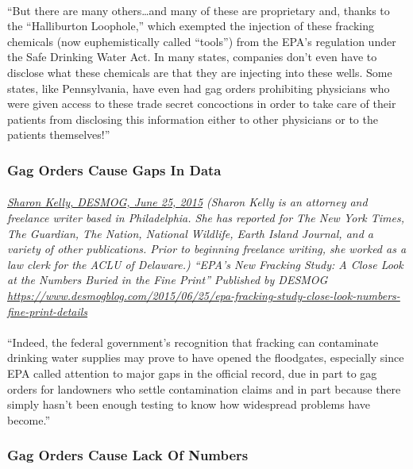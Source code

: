 \documentclass{article}
\begin{document}
\paragraph{}
``But there are many others…and many of these are proprietary and, thanks to the “Halliburton Loophole,” which exempted the injection of these fracking chemicals (now euphemistically called “tools”) from the EPA’s regulation under the Safe Drinking Water Act. In many states, companies don’t even have to disclose what these chemicals are that they are injecting into these wells. Some states, like Pennsylvania, have even had gag orders prohibiting physicians who were given access to these trade secret concoctions in order to take care of their patients from disclosing this information either to other physicians or to the patients themselves!”

\subsubsection{Gag Orders Cause Gaps In Data}
\paragraph{}
\small
\textit{
\underline{Sharon Kelly, DESMOG,  June 25, 2015}
(Sharon Kelly is an attorney and freelance writer based in Philadelphia. She has reported for The New York Times, The Guardian, The Nation, National Wildlife, Earth Island Journal, and a variety of other publications. Prior to beginning freelance writing, she worked as a law clerk for the ACLU of Delaware.) “EPA's New Fracking Study: A Close Look at the Numbers Buried in the Fine Print” Published by DESMOG  
\url{https://www.desmogblog.com/2015/06/25/epa-fracking-study-close-look-numbers-fine-print-details}}
\normalsize

\paragraph{}
``Indeed, the federal government’s recognition that fracking can contaminate drinking water supplies may prove to have opened the floodgates, especially since EPA called attention to major gaps in the official record, due in part to gag orders for landowners who settle contamination claims and in part because there simply hasn’t been enough testing to know how widespread problems have become.”

\subsubsection{Gag Orders Cause Lack Of Numbers}
\end{document}
